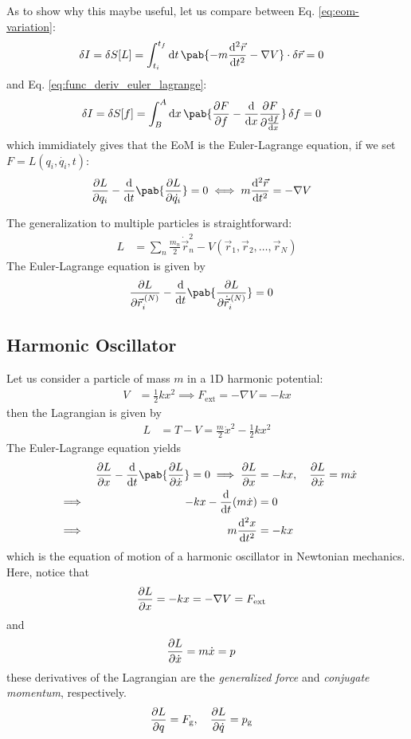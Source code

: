As to show why this maybe useful, let us compare between Eq. \eqref{eq:eom-variation}:
\begin{align}
  \fdif{I} = \fdif{S}[L] & = \int_{t_i}^{t_f} \odif{t} \, \pab{- m \odv[2]{\vec{r}}{t} - \nabla V} \cdot \fdif{\vec{r}} = 0
\end{align}
and Eq. \eqref{eq:func_deriv_euler_lagrange}:
\begin{align}
  \fdif{I} = \fdif{S}[f] & = \int_B^A \odif{x} \, \pab{\pdv{F}{f} - \odv{}{x} \pdv{F}{\odv{f}{x}}} \fdif{f} = 0
\end{align}
which immidiately gives that the EoM is the Euler-Lagrange equation, if we set $F = L(q_i, \dot{q_i}, t)$:
\begin{align}
  \pdv{L}{q_i} - \odv{}{t} \pab{\pdv{L}{\dot{q_i}}} & = 0 \iff m \odv[2]{\vec{r}}{t} = - \nabla V
\end{align}

The generalization to multiple particles is straightforward:
\begin{align}
  L & = \sum_{n} \frac{m_n}{2} \dot{\vec{r}}_n^2 - V(\vec{r}_1, \vec{r}_2, \ldots, \vec{r}_N)
\end{align}
The Euler-Lagrange equation is given by
\begin{align}
  \pdv{L}{\vec{r}_i^{\, (N)}} - \odv{}{t} \pab{\pdv{L}{\dot{\vec{r}}_i^{\, (N)}}} & = 0
\end{align}

\subsection{Harmonic Oscillator}
Let us consider a particle of mass $m$ in a 1D harmonic potential:
\begin{align}
  V & = \frac{1}{2} k x^2 \implies F_{\text{ext}} = - \nabla V = -k x
\end{align}
then the Lagrangian is given by
\begin{align}
  L & = T - V = \frac{m}{2} \dot{x}^2 - \frac{1}{2} k x^2
\end{align}
The Euler-Lagrange equation yields
\begin{alignat}{2}
   &          & \pdv{L}{x} - \odv{}{t} \pab{\pdv{L}{\dot{x}}} = 0 \implies \pdv{L}{x} & = -k x, \quad \pdv{L}{\dot{x}} = m \dot{x} \\
   & \implies & \quad -k x - \odv{}{t} (m \dot{x})                                    & = 0                                        \\
   & \implies & \quad m \odv[2]{x}{t}                                                 & = -k x
\end{alignat}
which is the equation of motion of a harmonic oscillator in Newtonian mechanics.
Here, notice that
\begin{align}
  \pdv{L}{x} & = -k x = - \nabla V = F_{\text{ext}}
\end{align}
and
\begin{align}
  \pdv{L}{\dot{x}} & = m \dot{x} = p
\end{align}
these derivatives of the Lagrangian are the \emph{generalized force} and \emph{conjugate momentum}, respectively.
\begin{align}
  \pdv{L}{q} & = F_{\text{g}}, \quad \pdv{L}{\dot{q}} = p_{\text{g}}
\end{align}
